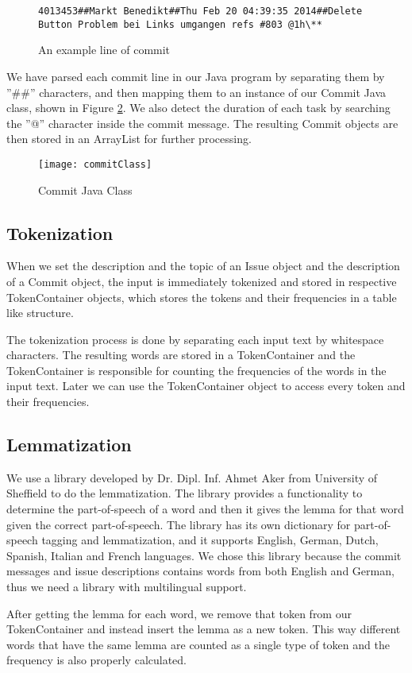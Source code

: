 \begin{figure}
\centering
\verb/4013453##Markt Benedikt##Thu Feb 20 04:39:35 2014##Delete Button Problem bei Links umgangen refs #803 @1h\**  /
\caption{An example line of commit}
\label{fig:commitLine}
\end{figure}

We have parsed each commit line in our Java program by separating them by ''\#\#'' characters, and then mapping them to an instance of our Commit Java class, shown in Figure \ref{fig:commit}. We also detect the duration of each task by searching the ''@'' character inside the commit message. The resulting Commit objects are then stored in an ArrayList for further processing.

\begin{figure}
\centering
\texttt{[image: commitClass]}
\caption{Commit Java Class}
\label{fig:commit}
\end{figure}

\subsection{Tokenization}

When we set the description and the topic of an Issue object and the description of a Commit object, the input is immediately tokenized and stored in respective TokenContainer objects, which stores the tokens and their frequencies in a table like structure.

The tokenization process is done by separating each input text by whitespace characters. The resulting words are stored in a TokenContainer and the TokenContainer is responsible for counting the frequencies of the words in the input text. Later we can use the TokenContainer object to access every token and their frequencies.


\subsection{Lemmatization}

We use a library developed by Dr. Dipl. Inf. Ahmet Aker from University of Sheffield to do the lemmatization. The library provides a functionality to determine the part-of-speech of a word and then it gives the lemma for that word given the correct part-of-speech. The library has its own dictionary for part-of-speech tagging and lemmatization, and it supports English, German, Dutch, Spanish, Italian and French languages. We chose this library because the commit messages and issue descriptions contains words from both English and German, thus we need a library with multilingual support.

After getting the lemma for each word, we remove that token from our TokenContainer and instead insert the lemma as a new token. This way different words that have the same lemma are counted as a single type of token and the frequency is also properly calculated.

